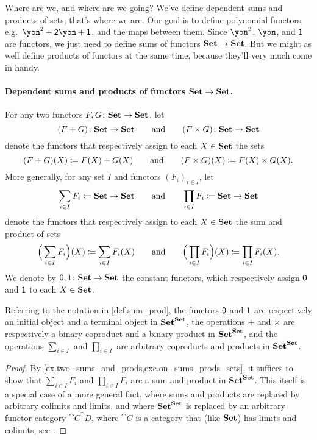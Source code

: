 \documentclass[DynamicalBook]{subfiles}
\begin{document}
Where are we, and where are we going? We've define dependent sums and products of sets; that's where we are. Our goal is to define polynomial functors, e.g.\ $\yon^\2+\2\yon+\1$, and the maps between them. Since $\yon^2$, $\yon$, and $\textsf{1}$ are functors, we just need to define sums of functors $\textbf{Set}\to\textbf{Set}$. But we might as well define products of functors at the same time, because they'll very much come in handy.

\paragraph{Dependent sums and products of functors $\textbf{Set}\to\textbf{Set}$.}

\begin{definition}\label{def.sum_prod}
For any two functors $F,G\colon\textbf{Set}\to\textbf{Set}$, let
\[
  (F+G)\colon\textbf{Set}\to\textbf{Set}
  \qquad\text{and}\qquad
  (F\times G)\colon\textbf{Set}\to\textbf{Set}
\]
denote the functors that respectively assign to each $X\in\textbf{Set}$ the sets
\[
  (F+G)(X)\coloneqq F(X)+G(X)
  \qquad\text{and}\qquad
	(F\times G)(X)\coloneqq F(X)\times G(X).
\]
More generally, for any set $I$ and functors $(F_i)_{i\in I}$, let
\[
\sum_{i\in I}F_i\coloneq\textbf{Set}\to\textbf{Set}
\qquad\text{and}\qquad
\prod_{i\in I}F_i\coloneq\textbf{Set}\to\textbf{Set}
\]
denote the functors that respectively assign to each $X\in\textbf{Set}$ the sum and product of sets
\[
	\Big(\sum_{i\in I}F_i\Big)(X)\coloneqq\sum_{i\in I} F_i(X)
	\qquad\text{and}\qquad
	\Big(\prod_{i\in I}F_i\Big)(X)\coloneqq\prod_{i\in I} F_i(X).
\]
We denote by $\textsf{0},\textsf{1}\colon\textbf{Set}\to\textbf{Set}$ the constant functors, which respectively assign $\textsf{0}$ and $\textsf{1}$ to each $X\in\textbf{Set}$.
\end{definition}

\begin{proposition}
Referring to the notation in \cref{def.sum_prod}, the functors $\textsf{0}$ and $\textsf{1}$ are respectively an initial object and a terminal object in $\textbf{Set}^{\textbf{Set}}$, the operations $+$ and $\times$ are respectively a binary coproduct and a binary product in $\textbf{Set}^{\textbf{Set}}$, and the operations $\sum_{i\in I}$ and $\prod_{i\in I}$ are arbitrary coproducts and products in $\textbf{Set}^{\textbf{Set}}$.
\end{proposition}
\begin{proof}
By \cref{ex.two_sums_and_prods,exc.on_sums_prods_sets}, it suffices to show that $\sum_{i\in I}F_i$ and $\prod_{i\in I}F_i$ are a sum and product in $\textbf{Set}^{\textbf{Set}}$. This itself is a special case of a more general fact, where sums and products are replaced by arbitrary colimits and limits, and where $\textbf{Set}^{\textbf{Set}}$ is replaced by an arbitrary functor category $\cat{C}^\cat{D}$, where $\cat{C}$ is a category that (like $\textbf{Set}$) has limits and colimits; see \cite[page 22 -- 23, displays (24) and (25)]{macLane1992sheaves}.
\end{proof}
\end{document}
